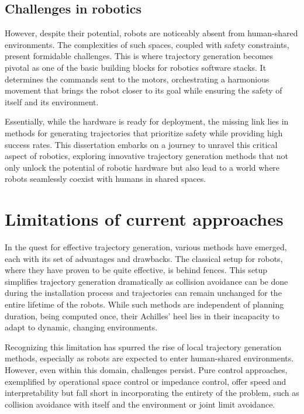 \subsection{Challenges in robotics}

However, despite their potential, robots are noticeably absent from human-shared
environments. The complexities of such spaces, coupled with safety constraints,
present formidable challenges. This is where trajectory generation becomes
pivotal as one of the basic building blocks for robotics
software stacks.
It determines the commands sent to the motors, orchestrating a harmonious
movement that brings the robot closer to its goal while
ensuring the safety of itself and its environment.

Essentially, while the hardware is ready for deployment, the missing link lies
in methods for generating trajectories that prioritize
safety while providing high success rates. This dissertation
embarks on a journey to unravel this critical aspect of robotics, exploring
innovative trajectory generation methods that not only unlock the potential of
robotic hardware but also lead to a world where robots seamlessly coexist with
humans in shared spaces.

\section{Limitations of current approaches}

In the quest for effective trajectory generation, various
methods have emerged, each with its set of advantages and
drawbacks. The classical setup for robots, where they have
proven to be quite effective, is behind fences. This setup
simplifies trajectory generation dramatically as collision
avoidance can be done during the installation process and
trajectories can remain unchanged for the entire lifetime of
the robots. While such methods are independent of planning
duration, being computed once, their Achilles' heel lies in
their incapacity to adapt to dynamic, changing environments.

Recognizing this limitation has spurred the rise of local
trajectory generation methods, especially as robots are
expected to enter human-shared environments. However, even
within this domain, challenges persist. Pure control
approaches, exemplified by operational space control or
impedance control, offer speed and interpretability but fall
short in incorporating the entirety of the problem, such as
collision avoidance with itself and the environment or
joint limit avoidance.

